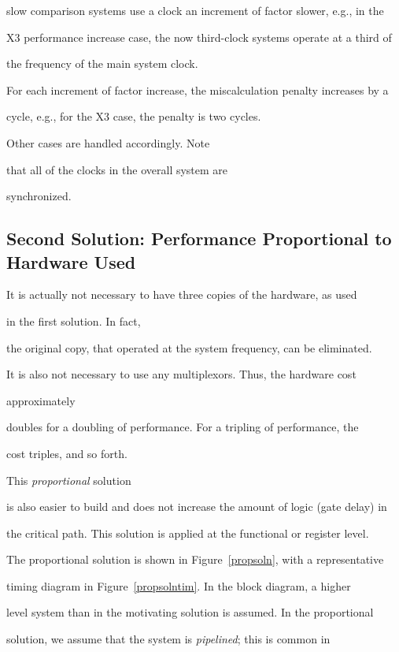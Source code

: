 \documentclass[12pt,dvips]{article}
\begin{document}
slow comparison systems use a clock an increment of factor slower, e.g., in the

X3 performance increase case, the now third-clock systems operate at a third of

the frequency of the main system clock.

For each increment of factor increase, the miscalculation penalty increases by a

cycle, e.g., for the X3 case, the penalty is two cycles.

Other cases are handled accordingly. Note

that all of the clocks in the overall system are

synchronized.





\subsection{Second Solution: Performance Proportional to Hardware Used}

It is actually not necessary to have three copies of the hardware, as used

in the first solution. In fact,

the original copy, that operated at the system frequency, can be eliminated.

It is also not necessary to use any multiplexors. Thus, the hardware cost

approximately

doubles for a doubling of performance. For a tripling of performance, the

cost triples, and so forth. 



This {\it proportional} solution

is also easier to build and does not increase the amount of logic (gate delay) in

the critical path. This solution is applied at the functional or register level.



The proportional solution is shown in Figure~\ref{propsoln}, with a representative

timing diagram in Figure~\ref{propsolntim}. In the block diagram, a higher

level system than in the motivating solution is assumed. In the proportional

solution, we assume that the system is {\it pipelined}; this is common in
\end{document}
